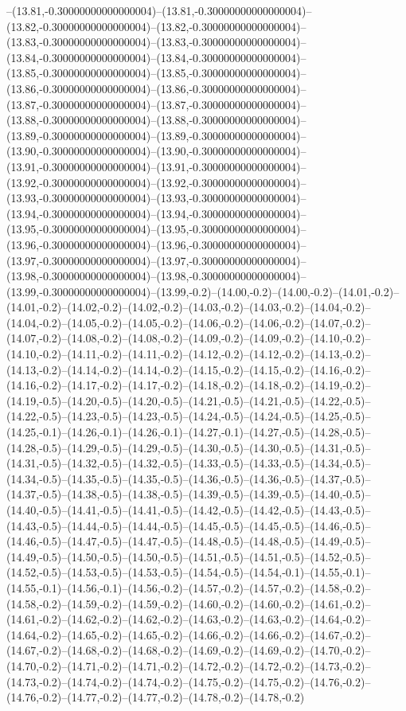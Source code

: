 --(13.81,-0.30000000000000004)--(13.81,-0.30000000000000004)--(13.82,-0.30000000000000004)--(13.82,-0.30000000000000004)--(13.83,-0.30000000000000004)--(13.83,-0.30000000000000004)--(13.84,-0.30000000000000004)--(13.84,-0.30000000000000004)--(13.85,-0.30000000000000004)--(13.85,-0.30000000000000004)--(13.86,-0.30000000000000004)--(13.86,-0.30000000000000004)--(13.87,-0.30000000000000004)--(13.87,-0.30000000000000004)--(13.88,-0.30000000000000004)--(13.88,-0.30000000000000004)--(13.89,-0.30000000000000004)--(13.89,-0.30000000000000004)--(13.90,-0.30000000000000004)--(13.90,-0.30000000000000004)--(13.91,-0.30000000000000004)--(13.91,-0.30000000000000004)--(13.92,-0.30000000000000004)--(13.92,-0.30000000000000004)--(13.93,-0.30000000000000004)--(13.93,-0.30000000000000004)--(13.94,-0.30000000000000004)--(13.94,-0.30000000000000004)--(13.95,-0.30000000000000004)--(13.95,-0.30000000000000004)--(13.96,-0.30000000000000004)--(13.96,-0.30000000000000004)--(13.97,-0.30000000000000004)--(13.97,-0.30000000000000004)--(13.98,-0.30000000000000004)--(13.98,-0.30000000000000004)--(13.99,-0.30000000000000004)--(13.99,-0.2)--(14.00,-0.2)--(14.00,-0.2)--(14.01,-0.2)--(14.01,-0.2)--(14.02,-0.2)--(14.02,-0.2)--(14.03,-0.2)--(14.03,-0.2)--(14.04,-0.2)--(14.04,-0.2)--(14.05,-0.2)--(14.05,-0.2)--(14.06,-0.2)--(14.06,-0.2)--(14.07,-0.2)--(14.07,-0.2)--(14.08,-0.2)--(14.08,-0.2)--(14.09,-0.2)--(14.09,-0.2)--(14.10,-0.2)--(14.10,-0.2)--(14.11,-0.2)--(14.11,-0.2)--(14.12,-0.2)--(14.12,-0.2)--(14.13,-0.2)--(14.13,-0.2)--(14.14,-0.2)--(14.14,-0.2)--(14.15,-0.2)--(14.15,-0.2)--(14.16,-0.2)--(14.16,-0.2)--(14.17,-0.2)--(14.17,-0.2)--(14.18,-0.2)--(14.18,-0.2)--(14.19,-0.2)--(14.19,-0.5)--(14.20,-0.5)--(14.20,-0.5)--(14.21,-0.5)--(14.21,-0.5)--(14.22,-0.5)--(14.22,-0.5)--(14.23,-0.5)--(14.23,-0.5)--(14.24,-0.5)--(14.24,-0.5)--(14.25,-0.5)--(14.25,-0.1)--(14.26,-0.1)--(14.26,-0.1)--(14.27,-0.1)--(14.27,-0.5)--(14.28,-0.5)--(14.28,-0.5)--(14.29,-0.5)--(14.29,-0.5)--(14.30,-0.5)--(14.30,-0.5)--(14.31,-0.5)--(14.31,-0.5)--(14.32,-0.5)--(14.32,-0.5)--(14.33,-0.5)--(14.33,-0.5)--(14.34,-0.5)--(14.34,-0.5)--(14.35,-0.5)--(14.35,-0.5)--(14.36,-0.5)--(14.36,-0.5)--(14.37,-0.5)--(14.37,-0.5)--(14.38,-0.5)--(14.38,-0.5)--(14.39,-0.5)--(14.39,-0.5)--(14.40,-0.5)--(14.40,-0.5)--(14.41,-0.5)--(14.41,-0.5)--(14.42,-0.5)--(14.42,-0.5)--(14.43,-0.5)--(14.43,-0.5)--(14.44,-0.5)--(14.44,-0.5)--(14.45,-0.5)--(14.45,-0.5)--(14.46,-0.5)--(14.46,-0.5)--(14.47,-0.5)--(14.47,-0.5)--(14.48,-0.5)--(14.48,-0.5)--(14.49,-0.5)--(14.49,-0.5)--(14.50,-0.5)--(14.50,-0.5)--(14.51,-0.5)--(14.51,-0.5)--(14.52,-0.5)--(14.52,-0.5)--(14.53,-0.5)--(14.53,-0.5)--(14.54,-0.5)--(14.54,-0.1)--(14.55,-0.1)--(14.55,-0.1)--(14.56,-0.1)--(14.56,-0.2)--(14.57,-0.2)--(14.57,-0.2)--(14.58,-0.2)--(14.58,-0.2)--(14.59,-0.2)--(14.59,-0.2)--(14.60,-0.2)--(14.60,-0.2)--(14.61,-0.2)--(14.61,-0.2)--(14.62,-0.2)--(14.62,-0.2)--(14.63,-0.2)--(14.63,-0.2)--(14.64,-0.2)--(14.64,-0.2)--(14.65,-0.2)--(14.65,-0.2)--(14.66,-0.2)--(14.66,-0.2)--(14.67,-0.2)--(14.67,-0.2)--(14.68,-0.2)--(14.68,-0.2)--(14.69,-0.2)--(14.69,-0.2)--(14.70,-0.2)--(14.70,-0.2)--(14.71,-0.2)--(14.71,-0.2)--(14.72,-0.2)--(14.72,-0.2)--(14.73,-0.2)--(14.73,-0.2)--(14.74,-0.2)--(14.74,-0.2)--(14.75,-0.2)--(14.75,-0.2)--(14.76,-0.2)--(14.76,-0.2)--(14.77,-0.2)--(14.77,-0.2)--(14.78,-0.2)--(14.78,-0.2)